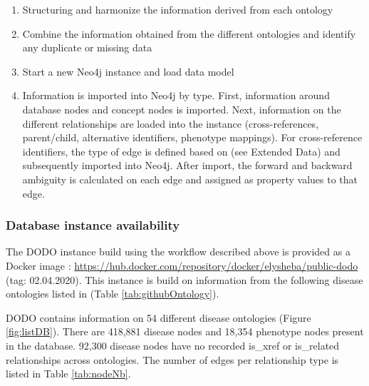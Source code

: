 \documentclass[9pt,a4paper,]{extarticle}
\begin{document}
\begin{enumerate}
\def\labelenumi{\arabic{enumi}.}
\item
  Structuring and harmonize the information derived from each ontology
\item
  Combine the information obtained from the different ontologies and identify any duplicate or missing data
\item
  Start a new Neo4j instance and load data model
\item
  Information is imported into Neo4j by type. First, information around database nodes and concept nodes is imported. Next, information on the different relationships are loaded into the instance (cross-references, parent/child, alternative identifiers, phenotype mappings). For cross-reference identifiers, the type of edge is defined based on (see Extended Data) and subsequently imported into Neo4j. After import, the forward and backward ambiguity is calculated on each edge and assigned as property values to that edge.
\end{enumerate}

\hypertarget{database-instance-availability}{%
\subsubsection{Database instance availability}\label{database-instance-availability}}

The DODO instance build using the workflow described above is provided as a Docker image \citep{Docker2019}: \url{https://hub.docker.com/repository/docker/elysheba/public-dodo} (tag: 02.04.2020). This instance is build on information from the following disease ontologies listed in (Table \ref{tab:githubOntology}).

DODO contains information on 54 different disease ontologies (Figure \ref{fig:listDB}). There are 418,881 disease nodes and 18,354 phenotype nodes present in the database. 92,300 disease nodes have no recorded is\_xref or is\_related relationships across ontologies. The number of edges per relationship type is listed in Table \ref{tab:nodeNb}.
\end{document}
